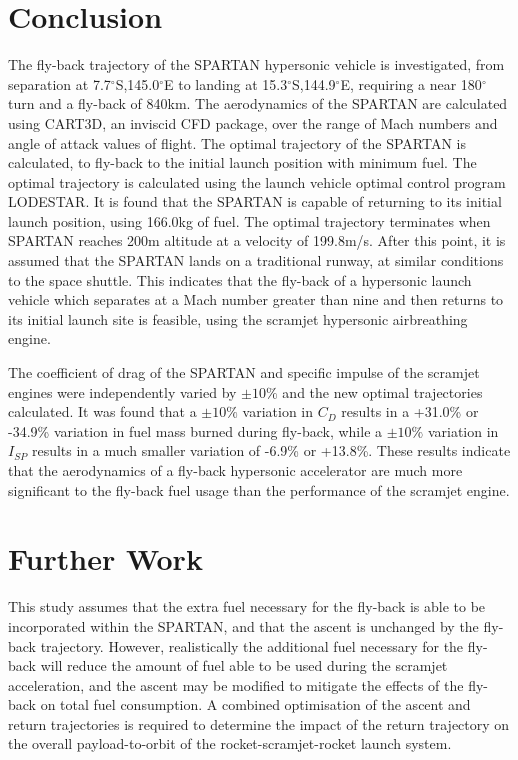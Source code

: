 \documentclass{article}
\begin{document}
\section{Conclusion}
The fly-back trajectory of the SPARTAN hypersonic vehicle is investigated, from separation at 7.7$^\circ$S,145.0$^\circ$E to landing at 15.3$^\circ$S,144.9$^\circ$E, requiring a near 180$^\circ$ turn and a fly-back of 840km. The aerodynamics of the SPARTAN are calculated using CART3D, an inviscid CFD package, over the range of Mach numbers and angle of attack values of flight. The optimal trajectory of the SPARTAN is calculated, to fly-back to the initial launch position with minimum fuel. The optimal trajectory is calculated using the launch vehicle optimal control program LODESTAR. It is found that the SPARTAN is capable of returning to its initial launch position, using 166.0kg of fuel. The optimal trajectory terminates when SPARTAN reaches 200m altitude at a velocity of 199.8m/s. After this point, it is assumed that the SPARTAN lands on a traditional runway, at similar conditions to the space shuttle.  
This indicates that the fly-back of a hypersonic launch vehicle which separates at a Mach number greater than nine and then returns to its initial launch site is feasible, using the scramjet hypersonic airbreathing engine. 

The coefficient of drag of the SPARTAN and specific impulse of the scramjet engines were independently varied by $\pm10\%$ and the new optimal trajectories calculated. It was found that a $\pm10\%$ variation in $C_D$ results in a +31.0\% or -34.9\% variation in fuel mass burned during fly-back, while a $\pm10\%$ variation in $I_{SP}$ results in a much smaller variation of -6.9\% or +13.8\%. These results indicate that the aerodynamics of a fly-back hypersonic accelerator are much more significant to the fly-back fuel usage than the performance of the scramjet engine. 

\section{Further Work}
This study assumes that the extra fuel necessary for the fly-back is able to be incorporated within the SPARTAN, and that the ascent is unchanged by the fly-back trajectory. However, realistically the additional fuel necessary for the fly-back will reduce the amount of fuel able to be used during the scramjet acceleration, and the ascent may be modified to mitigate the effects of the fly-back on total fuel consumption. A combined optimisation of the ascent and return trajectories is required to determine the impact of the return trajectory on the overall payload-to-orbit of the rocket-scramjet-rocket launch system. 


\end{document}
